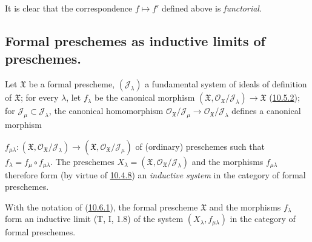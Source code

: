 It is clear that the correspondence $f\mapsto f'$ defined above is
\emph{functorial}.


\subsection{Formal preschemes as inductive limits of preschemes.}
\label{subsection:I.10.6}

\begin{env}[10.6.1]
\label{I.10.6.1}
Let $\mathfrak{X}$ be a formal prescheme,
$(\mathscr{J}_\lambda)$ a fundamental system of ideals of definition of
$\mathfrak{X}$; for every $\lambda$, let $f_\lambda$ be the canonical
morphism
$(\mathfrak{X},\mathscr{O}_{\mathfrak{X}}/\mathscr{J}_\lambda)
\to\mathfrak{X}$ (\hyperref[I.10.5.2]{10.5.2}); for
$\mathscr{J}_\mu\subset\mathscr{J}_\lambda$, the canonical homomorphism
$\mathscr{O}_{\mathfrak{X}}/\mathscr{J}_\mu\to
\mathscr{O}_{\mathfrak{X}}/\mathscr{J}_\lambda$ defines a canonical
morphism


$f_{\mu\lambda}:(\mathfrak{X},
\mathscr{O}_{\mathfrak{X}}/\mathscr{J}_\lambda)\to
(\mathfrak{X},\mathscr{O}_{\mathfrak{X}}/\mathscr{J}_\mu)$ of
(ordinary) preschemes such that $f_\lambda=f_\mu\circ f_{\mu\lambda}$.
The preschemes
$X_\lambda=(\mathfrak{X},
\mathscr{O}_{\mathfrak{X}}/\mathscr{J}_\lambda)$ and the morphisms
$f_{\mu\lambda}$ therefore form (by virtue of
\hyperref[I.10.4.8]{10.4.8}) an \emph{inductive system} in the
category of formal preschemes.
\end{env}

\begin{proposition}[10.6.2]
\label{I.10.6.2}
With the notation of (\hyperref[I.10.6.1]{10.6.1}), the formal
prescheme $\mathfrak{X}$ and the morphisms $f_\lambda$ form an
inductive limit (T, I, 1.8) of the system $(X_\lambda,f_{\mu\lambda})$
in the category of formal preschemes.
\end{proposition}


